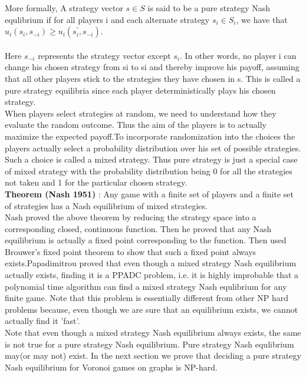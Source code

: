 \documentclass[12pt]{article}
\begin{document}
More formally, A strategy vector $s \in S$ is said to be a pure strategy Nash equlibrium if for all players i and each alternate strategy $s_i \in S_i$, we have that\\ \hspace*{20mm} $u_i(s_i,s_{-i}) \geq u_i(s_{i}^{'},s_{-i})$.\\\\ \indent Here $s_{-i}$ represents the strategy vector except $s_i$. In other words, no player i can change his chosen strategy from si to si and thereby improve his payoff, assuming that all other players stick to the strategies they have chosen in s. This is called a pure strategy equilibria since each player deterministically plays his chosen strategy.\\

When players select strategies at random, we need to understand how they evaluate the random outcome. Thus the aim of the players is to actually maximize the expected payoff.To incorporate randomization into the choices the players actually select a probability distribution over his set of possible strategies. Such a choice is called a mixed strategy. Thus pure strategy is just a special case of mixed strategy with the probability distribution being 0 for all the strategies not taken and 1 for the particular chosen strategy.\\

{ \bf Theorem (Nash 1951)}  : Any game with a finite set of players and a finite set of strategies has a Nash equilibrium of mixed strategies.
\\

Nash proved the above theorem by reducing the strategy space into a corresponding closed, continuous function. Then he proved that any Nash equilibrium is actually a fixed point corresponding to the function. Then used Brouwer's fixed point theorem to show that such a fixed point always exists.Papadimitrou proved that even though a mixed strategy Nash equilibrium actually exists, finding it is a PPADC problem, i.e. it is highly improbable that a polynomial time algorithm can find a mixed strategy Nash equlibrium for any finite game. Note that this problem is essentially different from other NP hard problems because, even though we are sure that an equilibrium exists, we cannot actually find it 'fast'.\\

Note that even though a mixed strategy Nash equilibrium always exists, the same is not true for a pure strategy Nash equilibrium. Pure strategy Nash equlibrium may(or may not) exist. In the next section we prove that deciding a pure strategy Nash equilibrium for Voronoi games on graphs is NP-hard.
\\
\end{document}
